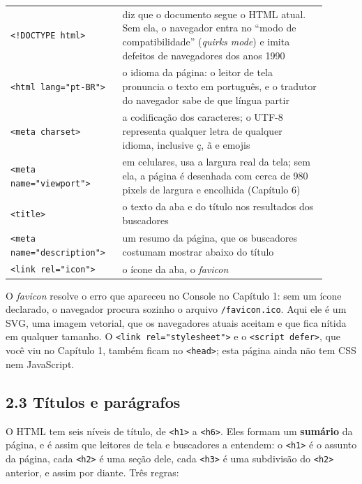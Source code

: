 \begin{center}
\begin{tabular}{@{}P{0.3\linewidth}P{0.6\linewidth}@{}}
\toprule
{}
 &  \\
\midrule
\texttt{<!DOCTYPE html>} & diz que o documento segue o HTML atual. Sem ela, o navegador entra no ``modo de compatibilidade'' (\textit{quirks mode}) e imita defeitos de navegadores dos anos 1990 \\
 \texttt{<html lang="pt-BR">} & o idioma da página: o leitor de tela pronuncia o texto em português, e o tradutor do navegador sabe de que língua partir \\
\texttt{<meta charset>} & a codificação dos caracteres; o UTF-8 representa qualquer letra de qualquer idioma, inclusive ç, ã e emojis \\
 \texttt{<meta name="viewport">} & em celulares, usa a largura real da tela; sem ela, a página é desenhada com cerca de 980 pixels de largura e encolhida (Capítulo 6) \\
\texttt{<title>} & o texto da aba e do título nos resultados dos buscadores \\
 \texttt{<meta name="description">} & um resumo da página, que os buscadores costumam mostrar abaixo do título \\
\texttt{<link rel="icon">} & o ícone da aba, o \textit{favicon} \\
\bottomrule
\end{tabular}
\end{center}

O \textit{favicon} resolve o erro que apareceu no Console no Capítulo 1: sem um ícone declarado, o navegador procura sozinho o arquivo \texttt{/favicon.ico}. Aqui ele é um SVG, uma imagem vetorial, que os navegadores atuais aceitam e que fica nítida em qualquer tamanho. O \texttt{<link rel="stylesheet">} e o \texttt{<script defer>}, que você viu no Capítulo 1, também ficam no \texttt{<head>}; esta página ainda não tem CSS nem JavaScript.

\subsection{2.3 Títulos e parágrafos}

O HTML tem seis níveis de título, de \texttt{<h1>} a \texttt{<h6>}. Eles formam um \textbf{sumário} da página, e é assim que leitores de tela e buscadores a entendem: o \texttt{<h1>} é o assunto da página, cada \texttt{<h2>} é uma seção dele, cada \texttt{<h3>} é uma subdivisão do \texttt{<h2>} anterior, e assim por diante. Três regras:

